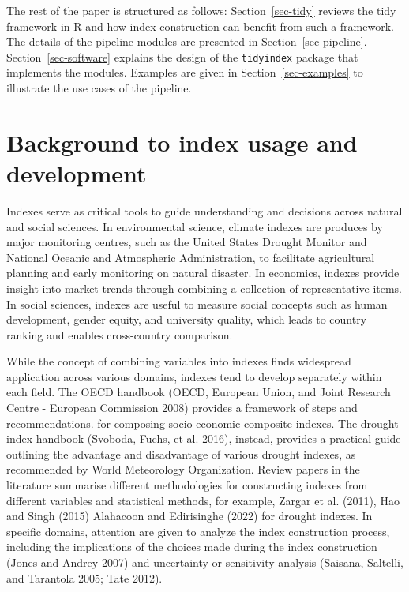\documentclass[
]{interact}
\begin{document}
The rest of the paper is structured as follows: Section~\ref{sec-tidy}
reviews the tidy framework in R and how index construction can benefit
from such a framework. The details of the pipeline modules are presented
in Section~\ref{sec-pipeline}. Section~\ref{sec-software} explains the
design of the \texttt{tidyindex} package that implements the modules.
Examples are given in Section~\ref{sec-examples} to illustrate the use
cases of the pipeline.

\hypertarget{background-to-index-usage-and-development}{%
\section{Background to index usage and
development}\label{background-to-index-usage-and-development}}

Indexes serve as critical tools to guide understanding and decisions
across natural and social sciences. In environmental science, climate
indexes are produces by major monitoring centres, such as the United
States Drought Monitor and National Oceanic and Atmospheric
Administration, to facilitate agricultural planning and early monitoring
on natural disaster. In economics, indexes provide insight into market
trends through combining a collection of representative items. In social
sciences, indexes are useful to measure social concepts such as human
development, gender equity, and university quality, which leads to
country ranking and enables cross-country comparison.

While the concept of combining variables into indexes finds widespread
application across various domains, indexes tend to develop separately
within each field. The OECD handbook (OECD, European Union, and Joint
Research Centre - European Commission 2008) provides a framework of
steps and recommendations. for composing socio-economic composite
indexes. The drought index handbook (Svoboda, Fuchs, et al. 2016),
instead, provides a practical guide outlining the advantage and
disadvantage of various drought indexes, as recommended by World
Meteorology Organization. Review papers in the literature summarise
different methodologies for constructing indexes from different
variables and statistical methods, for example, Zargar et al. (2011),
Hao and Singh (2015) Alahacoon and Edirisinghe (2022) for drought
indexes. In specific domains, attention are given to analyze the index
construction process, including the implications of the choices made
during the index construction (Jones and Andrey 2007) and uncertainty or
sensitivity analysis (Saisana, Saltelli, and Tarantola 2005; Tate 2012).
\end{document}

